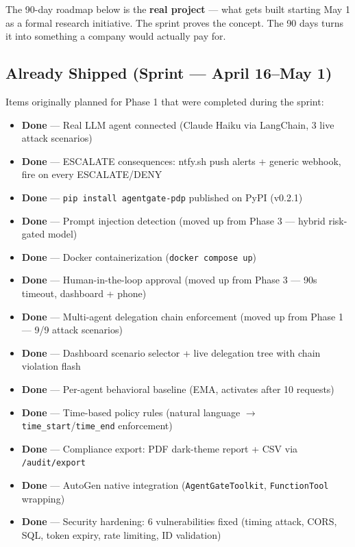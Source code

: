 \documentclass[12pt, a4paper]{article}
\begin{document}
The 90-day roadmap below is the \textbf{real project} — what gets built
starting May 1 as a formal research initiative. The sprint proves the concept.
The 90 days turns it into something a company would actually pay for.

\subsection{Already Shipped (Sprint — April 16--May 1)}

Items originally planned for Phase 1 that were completed during the sprint:

\begin{itemize}[noitemsep]
  \item \textcolor{permitgreen}{\textbf{Done}} — Real LLM agent connected (Claude Haiku via LangChain, 3 live attack scenarios)
  \item \textcolor{permitgreen}{\textbf{Done}} — ESCALATE consequences: ntfy.sh push alerts + generic webhook, fire on every ESCALATE/DENY
  \item \textcolor{permitgreen}{\textbf{Done}} — \texttt{pip install agentgate-pdp} published on PyPI (v0.2.1)
  \item \textcolor{permitgreen}{\textbf{Done}} — Prompt injection detection (moved up from Phase 3 — hybrid risk-gated model)
  \item \textcolor{permitgreen}{\textbf{Done}} — Docker containerization (\texttt{docker compose up})
  \item \textcolor{permitgreen}{\textbf{Done}} — Human-in-the-loop approval (moved up from Phase 3 — 90s timeout, dashboard + phone)
  \item \textcolor{permitgreen}{\textbf{Done}} — Multi-agent delegation chain enforcement (moved up from Phase 1 — 9/9 attack scenarios)
  \item \textcolor{permitgreen}{\textbf{Done}} — Dashboard scenario selector + live delegation tree with chain violation flash
  \item \textcolor{permitgreen}{\textbf{Done}} — Per-agent behavioral baseline (EMA, activates after 10 requests)
  \item \textcolor{permitgreen}{\textbf{Done}} — Time-based policy rules (natural language $\rightarrow$ \texttt{time\_start}/\texttt{time\_end} enforcement)
  \item \textcolor{permitgreen}{\textbf{Done}} — Compliance export: PDF dark-theme report + CSV via \texttt{/audit/export}
  \item \textcolor{permitgreen}{\textbf{Done}} — AutoGen native integration (\texttt{AgentGateToolkit}, \texttt{FunctionTool} wrapping)
  \item \textcolor{permitgreen}{\textbf{Done}} — Security hardening: 6 vulnerabilities fixed (timing attack, CORS, SQL, token expiry, rate limiting, ID validation)
\end{itemize}
\end{document}
